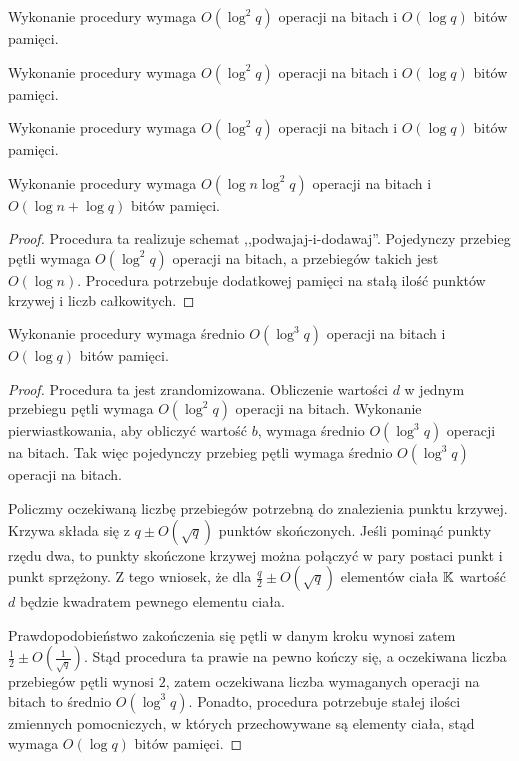 \begin{fact}
Wykonanie procedury 
wymaga \linebreak $O(\log^2 q)$ operacji na bitach i $O(\log q)$ bitów pamięci.
\end{fact}

\begin{fact}
Wykonanie procedury 
wymaga $O(\log^2 q)$ operacji na bitach i $O(\log q)$ bitów pamięci.
\end{fact}

\begin{fact}
Wykonanie procedury 
wymaga $O(\log^2 q)$ operacji na bitach i $O(\log q)$ bitów pamięci.
\end{fact}

\begin{lemma}
Wykonanie procedury 
wymaga \linebreak $O(\log n \log^2 q)$ operacji na bitach
i $O(\log n + \log q)$ bitów pamięci.
\end{lemma}

\begin{proof}
Procedura ta realizuje schemat ,,podwajaj-i-dodawaj''.
Pojedynczy przebieg pętli  wymaga
$O(\log^2 q)$ operacji na bitach,
a przebiegów takich jest $O(\log n)$.
Procedura potrzebuje dodatkowej pamięci na stałą ilość
punktów krzywej i liczb całkowitych.
\end{proof}

\begin{lemma}
Wykonanie procedury 
wymaga średnio \linebreak
$O(\log^3 q)$ operacji na bitach i $O(\log q)$ bitów pamięci.
\end{lemma}

\begin{proof}
Procedura ta jest zrandomizowana.
Obliczenie wartości $d$ w jednym przebiegu pętli
wymaga $O(\log^2 q)$ operacji na bitach.
Wykonanie pierwiastkowania, aby obliczyć wartość $b$,
wymaga średnio $O(\log^3 q)$ operacji na bitach.
Tak więc pojedynczy przebieg pętli 
wymaga średnio $O(\log^3 q)$ operacji na bitach.

\noindent
Policzmy oczekiwaną liczbę przebiegów potrzebną do znalezienia punktu krzywej.
Krzywa składa się z $q \pm O(\sqrt{q})$ punktów skończonych.
Jeśli pominąć punkty rzędu dwa,
to punkty skończone krzywej można połączyć w pary postaci
punkt i punkt sprzężony.
Z tego wniosek, że dla $\frac{q}{2} \pm O(\sqrt{q})$ elementów ciała $\mathbb{K}$
wartość $d$ będzie kwadratem pewnego elementu ciała.

\noindent
Prawdopodobieństwo zakończenia się pętli w danym kroku
wynosi zatem $\frac{1}{2} \pm O(\frac{1}{\sqrt{q}})$.
Stąd procedura ta prawie na pewno kończy się,
a oczekiwana liczba przebiegów pętli  wynosi $2$,
zatem oczekiwana liczba wymaganych operacji na bitach
to średnio $O(\log^3 q)$.
Ponadto, procedura potrzebuje stałej ilości zmiennych pomocniczych,
w których przechowywane są elementy ciała,
stąd wymaga $O(\log q)$ bitów pamięci.
\end{proof}

